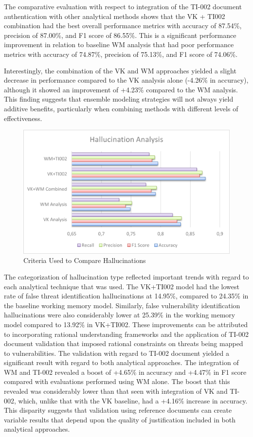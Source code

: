 \documentclass[sigconf]{acmart}
\begin{document}
The comparative evaluation with respect to integration of the TI-002 document authentication with other analytical methods shows that the VK + TI002 combination had the best overall performance metrics with accuracy of 87.54\%, precision of 87.00\%, and F1 score of 86.55\%. This is a significant performance improvement in relation to baseline WM analysis that had poor performance metrics with accuracy of 74.87\%, precision of 75.13\%, and F1 score of 74.06\%.

Interestingly, the combination of the VK and WM approaches yielded a slight decrease in performance compared to the VK analysis alone (-4.26\% in accuracy), although it showed an improvement of +4.23\% compared to the WM analysis. This finding suggests that ensemble modeling strategies will not always yield additive benefits, particularly when combining methods with different levels of effectiveness.

\begin{figure}[htbp]
    \centering
    \includegraphics[width=0.7\linewidth]{hallucination.png}
    \caption{Criteria Used to Compare Hallucinations}
    \label{fig:enter-label}
\end{figure}

The categorization of hallucination type reflected important trends with regard to each analytical technique that was used. The VK+TI002 model had the lowest rate of false threat identification hallucinations at 14.95\%, compared to 24.35\% in the baseline working memory model. Similarly, false vulnerability identification hallucinations were also considerably lower at 25.39\% in the working memory model compared to 13.92\% in VK+TI002. These improvements can be attributed to incorporating rational understanding frameworks and the application of TI-002 document validation that imposed rational constraints on threats being mapped to vulnerabilities.
The validation with regard to TI-002 document yielded a significant result with regard to both analytical approaches. The integration of WM and TI-002 revealed a boost of +4.65\% in accuracy and +4.47\% in F1 score compared with evaluations performed using WM alone. The boost that this revealed was considerably lower than that seen with integration of VK and TI-002, which, unlike that with the VK baseline, had a +4.16\% increase in accuracy. This disparity suggests that validation using reference documents can create variable results that depend upon the quality of justification included in both analytical approaches.
\end{document}
